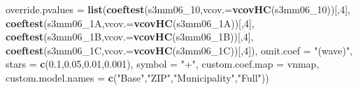 \documentclass[
]{article}
\newenvironment{Shaded}{\begin{snugshade}}{\end{snugshade}}
\newcommand{\DataTypeTok}[1]{\textcolor[rgb]{0.13,0.29,0.53}{#1}}
\newcommand{\DecValTok}[1]{\textcolor[rgb]{0.00,0.00,0.81}{#1}}
\newcommand{\FloatTok}[1]{\textcolor[rgb]{0.00,0.00,0.81}{#1}}
\newcommand{\KeywordTok}[1]{\textcolor[rgb]{0.13,0.29,0.53}{\textbf{#1}}}
\newcommand{\NormalTok}[1]{#1}
\newcommand{\StringTok}[1]{\textcolor[rgb]{0.31,0.60,0.02}{#1}}
\begin{document}
\begin{Shaded}
\begin{Highlighting}[]
          \DataTypeTok{override.pvalues =} \KeywordTok{list}\NormalTok{(}\KeywordTok{coeftest}\NormalTok{(s3mm06_}\DecValTok{10}\NormalTok{,}\DataTypeTok{vcov.=}\KeywordTok{vcovHC}\NormalTok{(s3mm06_}\DecValTok{10}\NormalTok{))[,}\DecValTok{4}\NormalTok{],}
                                  \KeywordTok{coeftest}\NormalTok{(s3mm06_1A,}\DataTypeTok{vcov.=}\KeywordTok{vcovHC}\NormalTok{(s3mm06_1A))[,}\DecValTok{4}\NormalTok{],}
                                  \KeywordTok{coeftest}\NormalTok{(s3mm06_1B,}\DataTypeTok{vcov.=}\KeywordTok{vcovHC}\NormalTok{(s3mm06_1B))[,}\DecValTok{4}\NormalTok{],}
                                  \KeywordTok{coeftest}\NormalTok{(s3mm06_1C,}\DataTypeTok{vcov.=}\KeywordTok{vcovHC}\NormalTok{(s3mm06_1C))[,}\DecValTok{4}\NormalTok{]),}
          \DataTypeTok{omit.coef =} \StringTok{"(wave)"}\NormalTok{, }\DataTypeTok{stars =} \KeywordTok{c}\NormalTok{(}\FloatTok{0.1}\NormalTok{,}\FloatTok{0.05}\NormalTok{,}\FloatTok{0.01}\NormalTok{,}\FloatTok{0.001}\NormalTok{), }\DataTypeTok{symbol =} \StringTok{"+"}\NormalTok{,}
          \DataTypeTok{custom.coef.map =}\NormalTok{ vnmap, }
          \DataTypeTok{custom.model.names =} \KeywordTok{c}\NormalTok{(}\StringTok{"Base"}\NormalTok{,}\StringTok{"ZIP"}\NormalTok{,}\StringTok{"Municipality"}\NormalTok{,}\StringTok{"Full"}\NormalTok{))}
\end{Highlighting}
\end{Shaded}
\end{document}
